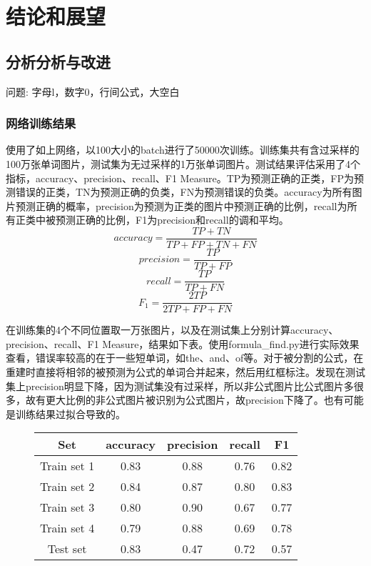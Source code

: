 
\chapter{结论和展望}

\section{分析分析与改进}

问题: 字母l，数字0，行间公式，大空白


\subsection{网络训练结果}
\noindent

使用了如上网络，以100大小的batch进行了50000次训练。训练集共有含过采样的100万张单词图片，测试集为无过采样的1万张单词图片。测试结果评估采用了4个指标，accuracy、precision、recall、F1 Measure。TP为预测正确的正类，FP为预测错误的正类，TN为预测正确的负类，FN为预测错误的负类。accuracy为所有图片预测正确的概率，precision为预测为正类的图片中预测正确的比例，recall为所有正类中被预测正确的比例，F1为precision和recall的调和平均。
\[accuracy = \frac {TP + TN} {TP + FP + TN + FN}\]
\[precision = \frac {TP} {TP + FP}\]
\[recall = \frac {TP} {TP + FN}\]
\[F_1 = \frac {2 TP } {2 TP + FP + FN}\]



在训练集的4个不同位置取一万张图片，以及在测试集上分别计算accuracy、precision、recall、F1 Measure，结果如下表。使用formula\_find.py进行实际效果查看，错误率较高的在于一些短单词，如the、and、of等。对于被分割的公式，在重建时直接将相邻的被预测为公式的单词合并起来，然后用红框标注。发现在测试集上precision明显下降，因为测试集没有过采样，所以非公式图片比公式图片多很多，故有更大比例的非公式图片被识别为公式图片，故precision下降了。也有可能是训练结果过拟合导致的。

\begin{figure}[hp]
\centering
\begin{tabular}{ccccc}
\toprule
Set& accuracy& precision& recall& F1\\
\midrule
Train set 1& 0.83& 0.88& 0.76& 0.82\\
Train set 2& 0.84& 0.87& 0.80& 0.83\\
Train set 3& 0.80& 0.90& 0.67& 0.77\\
Train set 4& 0.79& 0.88& 0.69& 0.78\\
Test set& 0.83& 0.47& 0.72& 0.57\\
\bottomrule
\end{tabular}
\end{figure}

